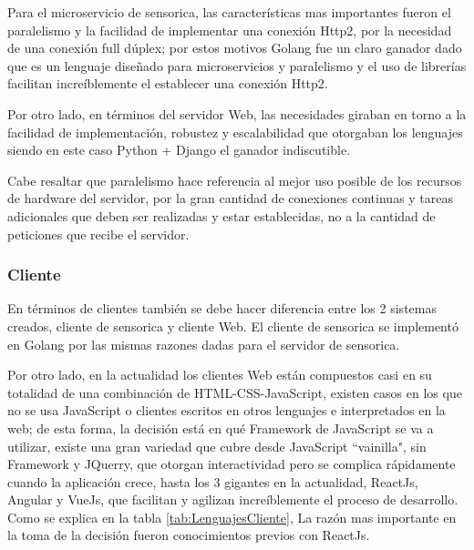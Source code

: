     Para el microservicio de sensorica, las características mas importantes fueron
    el paralelismo y la facilidad de implementar una conexión Http2, por la
    necesidad de una conexión full dúplex; por estos motivos Golang fue un claro
    ganador dado que es un lenguaje diseñado para microservicios y paralelismo y
    el uso de librerías facilitan increíblemente el establecer una conexión Http2.

    Por otro lado, en términos del servidor Web, las necesidades giraban en torno
    a la facilidad de implementación, robustez y escalabilidad que otorgaban los
    lenguajes siendo en este caso Python + Django el ganador indiscutible.


    Cabe resaltar que paralelismo hace referencia al mejor uso posible de los
    recursos de hardware del servidor, por la gran cantidad de conexiones
    continuas y tareas adicionales que deben  ser realizadas y estar
    establecidas, no a la cantidad de peticiones que recibe el servidor.

    \subsubsection{Cliente}

    En términos de clientes también se debe hacer diferencia entre los 2 sistemas
    creados, cliente de sensorica y cliente Web. El cliente de sensorica se
    implementó en Golang por las mismas razones dadas para el servidor de sensorica.

    Por otro lado, en la actualidad los clientes Web están compuestos casi en
    su totalidad de una combinación de HTML-CSS-JavaScript, existen casos en los
    que no se usa JavaScript o clientes escritos en otros lenguajes e interpretados
    en la web; de esta forma, la decisión está en qué Framework de JavaScript se
    va a utilizar, existe una gran variedad que cubre desde JavaScript ``vainilla",
    sin Framework y JQuerry, que otorgan interactividad pero se complica rápidamente
    cuando la aplicación crece, hasta los 3 gigantes en la actualidad, ReactJs,
    Angular y VueJs, que facilitan y agilizan increíblemente el proceso de desarrollo.
    Como se explica en la tabla \ref{tab:LenguajesCliente}, La razón mas importante
    en la toma de la decisión fueron conocimientos previos con ReactJs.


